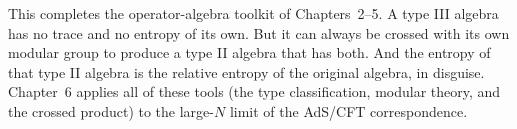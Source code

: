 \bigskip
\noindent This completes the operator-algebra toolkit of Chapters~2--5. A type III algebra has no trace and no
entropy of its own. But it can always be crossed with its own modular group to produce a type II algebra that
has both. And the entropy of that type II algebra is the relative entropy of the original algebra, in disguise.
Chapter~6 applies all of these tools (the type classification, modular theory, and the crossed product) to the
large-$N$ limit of the AdS/CFT correspondence.
